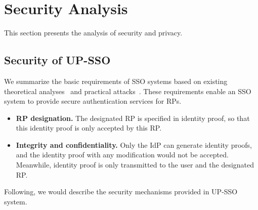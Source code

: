 \section{Security Analysis}
\label{sec:analysis}
This section presents the analysis of security and privacy. 

\subsection{Security of UP-SSO}
We summarize the basic requirements of SSO systems based on existing theoretical analyses~\cite{ArmandoCCCT08,FettKS16, FettKS17} and practical attacks~\cite{SomorovskyMSKJ12,WangCW12,ArmandoCCCPS13,WangZLG16,MainkaMS16,MainkaMSW17}. These requirements enable an SSO system to provide secure authentication services for RPs.
\begin{itemize}

\item
\textbf{RP designation.} The designated RP is specified in identity proof,
    so that this identity proof is  only accepted by this RP.


\item
\textbf{Integrity and confidentiality.}
 Only the IdP can generate identity proofs,
and the identity proof with any modification would not be accepted.
Meanwhile, identity proof is only transmitted to the user and the designated RP.
\end{itemize}


Following, we would describe the security mechanisms provided in UP-SSO system. 

